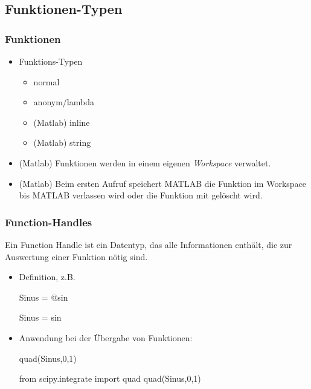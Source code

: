 \documentclass[hyperref={xetex}]{beamer}
\begin{document}
\subsection{Funktionen-Typen}
%
%
\begin{frame}[fragile]\frametitle{Funktionen}
\begin{itemize}
 \item Funktions-Typen
\begin{itemize}
\item normal
\item anonym/lambda
\item (Matlab) inline 
\item (Matlab) string 
\end{itemize}
\item (Matlab) Funktionen werden in einem eigenen {\it Workspace} verwaltet.
\item (Matlab) Beim ersten Aufruf speichert MATLAB die Funktion im Workspace bis MATLAB
  verlassen wird oder die Funktion  mit   gel\"oscht wird.
\end{itemize}
\end{frame}

%
%
\begin{frame}[fragile]\frametitle{Function-Handles}

Ein \alert{Function Handle} ist ein Datentyp, das alle Informationen
enth\"alt, die zur Auswertung einer Funktion n\"otig sind.\\
\begin{itemize}
\item Definition, z.B. 
\begin{matlabin}
Sinus = @sin 
\end{matlabin}
\begin{pyin}
Sinus = sin
\end{pyin}
\item Anwendung bei der \"Ubergabe von Funktionen:
\begin{matlabin}
quad(Sinus,0,1)
\end{matlabin}
\begin{pyin}
from scipy.integrate import quad
quad(Sinus,0,1)  
\end{pyin}
\end{itemize}
\end{frame}
\end{document}
